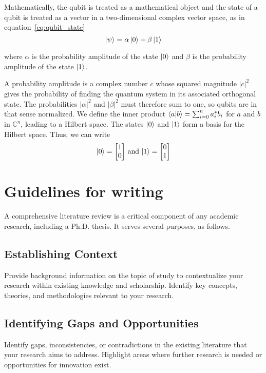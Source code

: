 Mathematically, the qubit is treated as a mathematical object and the state of a qubit is treated as a vector in a two-dimensional complex vector space, as in equation~\ref{eq:qubit_state}
\begin{equation}
\ket{\psi} = \alpha \ket{0} + \beta \ket{1}
\label{eq:qubit_state}
\end{equation}

where $\alpha$ is the probability amplitude of the state $\ket{0}$ and $\beta$ is the probability amplitude of the state $\ket{1}$.

A probability amplitude is a complex number $c$ whose squared magnitude $\vert c \vert^2$ gives the probability of finding the quantum system in its associated orthogonal state.
The probabilities $|\alpha|^2$ and $|\beta|^2$ must therefore sum to one, so qubits are in that sense normalized.
We define the inner product $\braket{a | b} = \sum_{i=0}^{n} a_i^* b_i$ for $a$ and $b$ in $\mathbb{C}^n$, leading to a Hilbert space.
The states $\ket{0}$ and $\ket{1}$ form a basis for the Hilbert space.
Thus, we can write
$$\ket{0} = \begin{bmatrix} 1 \\ 0 \end{bmatrix} \, \textrm{and} \, \ket{1} = \begin{bmatrix} 0 \\ 1 \end{bmatrix}$$


\section{Guidelines for writing}
A comprehensive literature review is a critical component of any academic research, including a Ph.D. thesis.
It serves several purposes, as follows.

\subsection{Establishing Context}
Provide background information on the topic of study to contextualize your research within existing knowledge and scholarship.
Identify key concepts, theories, and methodologies relevant to your research.

\subsection{Identifying Gaps and Opportunities}
Identify gaps, inconsistencies, or contradictions in the existing literature that your research aims to address.
Highlight areas where further research is needed or opportunities for innovation exist.

